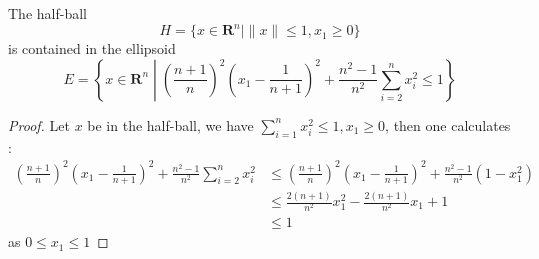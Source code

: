 \documentclass[10pt]{article}
\newcommand{\R}{\mathbf{R}}
\begin{document}
\begin{lemma}\label{lem:halfball}
The half-ball
\[
H = \{x \in \R^n | \| x \| \le 1, x_1 \ge 0 \}
\]
is contained in the ellipsoid
\[
E = \left\{ x \in \R^n \middle| \left(\frac{n+1}{n}\right)^2\left(x_1 - \frac{1}{n+1}\right)^2 + \frac{n^2-1}{n^2} \sum_{i=2}^n x_i^2 \le 1 \right\}
\]
\end{lemma}
\begin{proof}
Let $x$ be in the half-ball, we have $\sum_{i=1}^n x_i^2 \le 1, x_1 \ge 0$, then one calculates :
\begin{align*}
\left(\frac{n+1}{n} \right)^2 \left(x_1-\frac{1}{n+1}\right)^2 + \frac{n^2-1}{n^2} \sum_{i=2}^n x_i^2 
&\leq \left(\frac{n+1}{n} \right)^2 \left(x_1-\frac{1}{n+1}\right)^2 + \frac{n^2-1}{n^2}(1 - x_1^2)\\
&\leq \frac{2(n+1)}{n^2} x_1^2-\frac{2(n+1)}{n^2}x_1 + 1\\
&\leq 1 
\end{align*}
as  $0 \leq x_1 \leq 1$
\end{proof}
\end{document}
